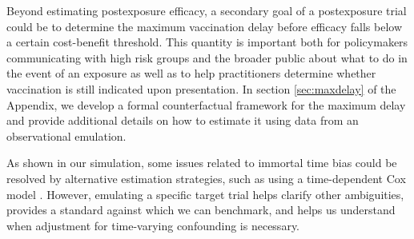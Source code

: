 \documentclass[11pt]{article}
\begin{document}
Beyond estimating postexposure efficacy, a secondary goal of a postexposure trial could be to determine the maximum vaccination delay before efficacy falls below a certain cost-benefit threshold. This quantity is important both for policymakers communicating with high risk groups and the broader public about what to do in the event of an exposure as well as to help practitioners determine whether vaccination is still indicated upon presentation. In section \ref{sec:maxdelay} of the Appendix, we develop a formal counterfactual framework for the maximum delay and provide additional details on how to estimate it using data from an observational emulation.

As shown in our simulation, some issues related to immortal time bias could be resolved by alternative estimation strategies, such as using a time-dependent Cox model \cite{suissa_immortal_2008}. However, emulating a specific target trial helps clarify other ambiguities, provides a standard against which we can benchmark, and helps us understand when adjustment for time-varying confounding is necessary.

\clearpage

\newpage

\printbibliography



\onehalfspacing
\end{document}
